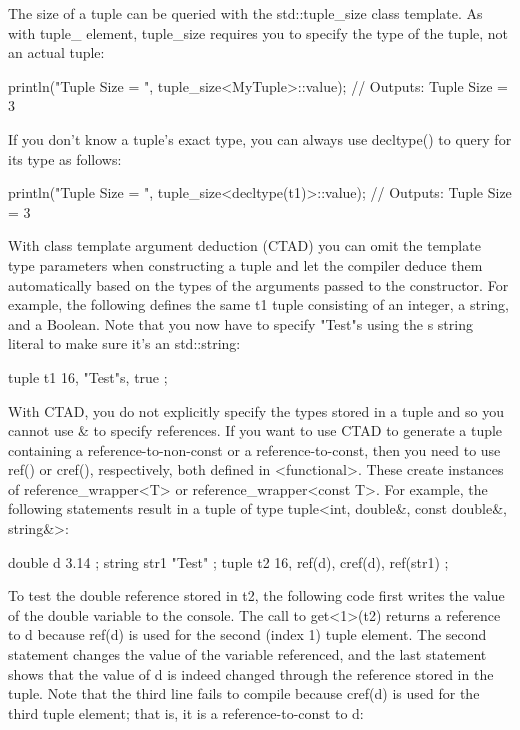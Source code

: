 The size of a tuple can be queried with the std::tuple\_size class template. As with tuple\_ element, tuple\_size requires you to specify the type of the tuple, not an actual tuple:

\begin{cpp}
println("Tuple Size = {}", tuple_size<MyTuple>::value);
// Outputs: Tuple Size = 3
\end{cpp}

If you don’t know a tuple’s exact type, you can always use decltype() to query for its type as follows:

\begin{cpp}
println("Tuple Size = {}", tuple_size<decltype(t1)>::value);
// Outputs: Tuple Size = 3
\end{cpp}

With class template argument deduction (CTAD) you can omit the template type parameters when constructing a tuple and let the compiler deduce them automatically based on the types of the arguments passed to the constructor. For example, the following defines the same t1 tuple consisting of an integer, a string, and a Boolean. Note that you now have to specify "Test"s using the s string literal to make sure it’s an std::string:

\begin{cpp}
tuple t1 { 16, "Test"s, true };
\end{cpp}

With CTAD, you do not explicitly specify the types stored in a tuple and so you cannot use \& to specify references. If you want to use CTAD to generate a tuple containing a reference-to-non-const or a reference-to-const, then you need to use ref() or cref(), respectively, both defined in <functional>. These create instances of reference\_wrapper<T> or reference\_wrapper<const T>. For example, the following statements result in a tuple of type tuple<int, double\&, const double\&, string\&>:

\begin{cpp}
double d { 3.14 };
string str1 { "Test" };
tuple t2 { 16, ref(d), cref(d), ref(str1) };
\end{cpp}

To test the double reference stored in t2, the following code first writes the value of the double variable to the console. The call to get<1>(t2) returns a reference to d because ref(d) is used for the second (index 1) tuple element. The second statement changes the value of the variable referenced, and the last statement shows that the value of d is indeed changed through the reference stored in the tuple. Note that the third line fails to compile because cref(d) is used for the third tuple element; that is, it is a reference-to-const to d:

